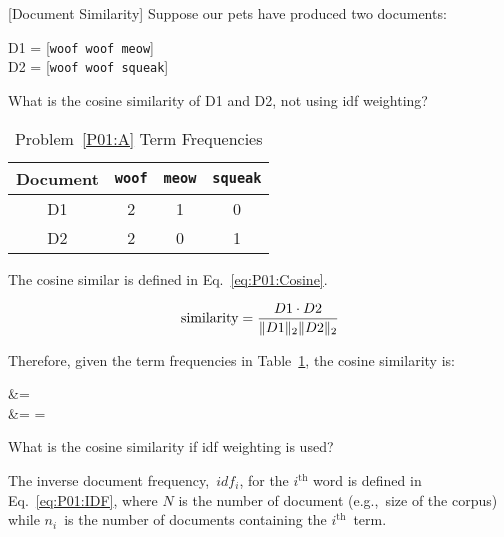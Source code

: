 \begin{problem}
   [\textnormal{Document Similarity}] Suppose our pets have produced two documents:

  D1 = [\texttt{woof woof meow}] \\ D2 = [\texttt{woof woof squeak}]
\end{problem}

\begin{subproblem}\label{P01:A}
   What is the cosine similarity of D1 and D2, not using idf weighting?
\end{subproblem}

  \begin{table}[h]
    \centering
    \caption{Problem~\ref{P01:A} Term Frequencies}\label{tab:P01:TermFreq}
    \begin{tabular}{|c|c|c|c|}
      \hline
      \textbf{Document} & \texttt{woof} & \texttt{meow} & \texttt{squeak} \\\hline\hline
      D1                & 2             & 1             & 0 \\\hline
      D2                & 2             & 0             & 1 \\\hline
    \end{tabular}
  \end{table}

The cosine similar is defined in Eq.~\eqref{eq:P01:Cosine}.

\begin{equation}\label{eq:P01:Cosine}
  \text{similarity} = \frac{D1 \cdot D2}{\lVert D1\rVert_{2}\lVert D2\rVert_{2}}
\end{equation}

\noindent
Therefore, given the term frequencies in Table~\ref{tab:P01:TermFreq}, the cosine similarity is:

\begin{aligncustom}
   &=  \\
                    &=  =  
\end{aligncustom}

\begin{subproblem}\label{P01:B}
   What is the cosine similarity if idf weighting is used?
\end{subproblem}

The inverse document frequency,~$idf_i$, for the $i^{\text{th}}$ word is defined in Eq.~\eqref{eq:P01:IDF}, where $N$ is the number of document (e.g.,~size of the corpus) while $n_i$~is the number of documents containing the $i^{\text{th}}$~term.

